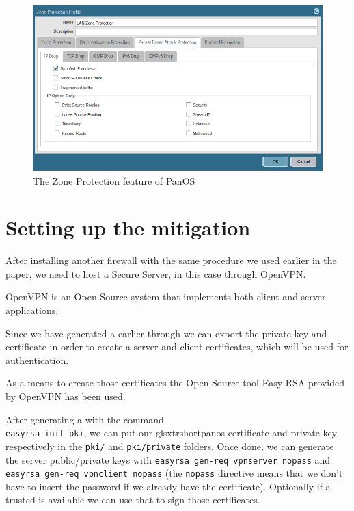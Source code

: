 \begin{figure}[h!]
 \centering
 \includegraphics[width=13.5cm]{img/zone_protection.png}
 \caption{The Zone Protection feature of PanOS}
 \label{fig: Zone Protection}
\end{figure}

\newpage

\section{Setting up the mitigation}

After installing another firewall with the same procedure we used earlier in the paper, we need to host a Secure Server, in this case through OpenVPN.

OpenVPN is an Open Source \cite{openvpn} system that implements both client and server applications.

Since we have generated a  earlier through  we can export the private key and certificate in order to create a server and client certificates, which will be used for authentication.

As a means to create those certificates the Open Source tool Easy-RSA\cite{easyrsa} provided by OpenVPN has been used.

After generating a  with the command \\
\verb|easyrsa init-pki|, we can put our glsxtrshort{panos} certificate and private key respectively in the \verb|pki/| and \verb|pki/private| folders. Once done, we can generate the server public/private keys with \verb|easyrsa gen-req vpnserver nopass|  and \\
\verb|easyrsa gen-req vpnclient nopass| (the \verb|nopass| directive means that we don't have to insert the password if we already have the certificate). Optionally if a trusted  is available we can use that to sign those certificates.

